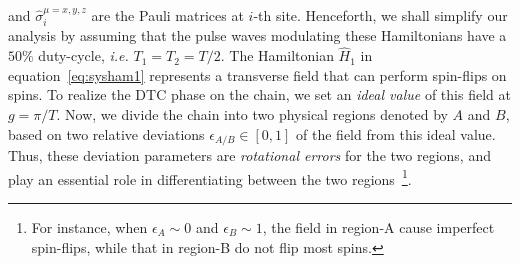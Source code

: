 \documentclass[12pt]{iopart}
\begin{document}
and $\hat{\sigma}^{\mu=x,y,z}_i$ are the Pauli matrices at $i$-th site.  Henceforth, we shall simplify our analysis by assuming that the pulse waves modulating these Hamiltonians have a $50 \%$ duty-cycle, \textit{i.e.} $T_1=T_2=T/2$.  The Hamiltonian $\hat{H}_1$ in equation~\eqref{eq:sysham1} represents a transverse field that can perform spin-flips on spins. To realize the DTC phase on the chain, we set an \textit{ideal value} of this field at $g=\pi/T$. Now, we divide the chain into two physical regions denoted by $A$ and $B$, based on two relative deviations $\epsilon_{A/B}\in[0,1]$ of the field from this ideal value. Thus, these deviation parameters are \textit{rotational errors} for the two regions, and play an essential role in differentiating between the two regions~\footnote{For instance, when $\epsilon_A \sim 0$ and $\epsilon_B \sim 1$, the field in region-A cause imperfect spin-flips, while that in region-B do not flip most spins.}.
\end{document}
